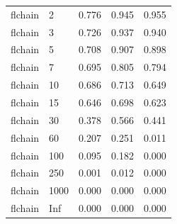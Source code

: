 \begin{tabular}{llrrr}
  flchain & 2 & 0.776 & 0.945 & 0.955 \\ 
  flchain & 3 & 0.726 & 0.937 & 0.940 \\ 
  flchain & 5 & 0.708 & 0.907 & 0.898 \\ 
  flchain & 7 & 0.695 & 0.805 & 0.794 \\ 
  flchain & 10 & 0.686 & 0.713 & 0.649 \\ 
  flchain & 15 & 0.646 & 0.698 & 0.623 \\ 
  flchain & 30 & 0.378 & 0.566 & 0.441 \\ 
  flchain & 60 & 0.207 & 0.251 & 0.011 \\ 
  flchain & 100 & 0.095 & 0.182 & 0.000 \\ 
  flchain & 250 & 0.001 & 0.012 & 0.000 \\ 
  flchain & 1000 & 0.000 & 0.000 & 0.000 \\ 
  flchain & Inf & 0.000 & 0.000 & 0.000 \\ 
   \bottomrule
\end{tabular}
